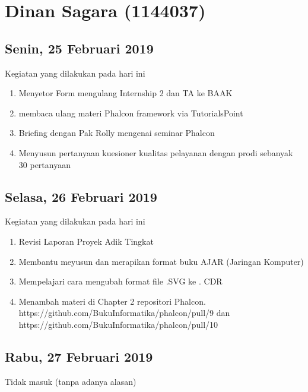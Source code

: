 \chapter{Dinan Sagara (1144037)}

\section{Senin, 25 Februari 2019}
Kegiatan yang dilakukan pada hari ini
\begin{enumerate}
\item Menyetor Form mengulang Internship 2 dan TA ke BAAK
\item membaca ulang materi Phalcon framework via TutorialsPoint
\item Briefing dengan Pak Rolly mengenai seminar Phalcon
\item Menyusun pertanyaan kuesioner kualitas pelayanan dengan prodi sebanyak 30 pertanyaan
\end{enumerate}

\section{Selasa, 26 Februari 2019}
Kegiatan yang dilakukan pada hari ini
\begin{enumerate}
\item Revisi Laporan Proyek Adik Tingkat
\item Membantu meyusun dan merapikan format buku AJAR (Jaringan Komputer)
\item Mempelajari cara mengubah format file .SVG ke . CDR
\item Menambah materi di Chapter 2 repositori Phalcon.
\subitem https://github.com/BukuInformatika/phalcon/pull/9 dan https://github.com/BukuInformatika/phalcon/pull/10
\end{enumerate}

\section{Rabu, 27 Februari 2019}
Tidak masuk (tanpa adanya alasan)

